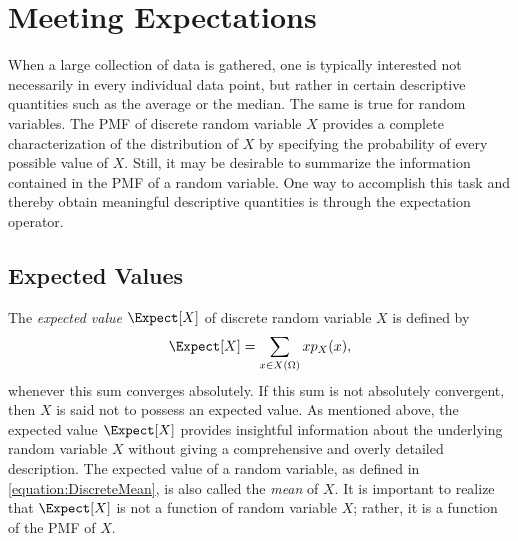 \chapter{Meeting Expectations}
\label{chapter:ExpectationsDiscrete}

When a large collection of data is gathered, one is typically interested not necessarily in every individual data point, but rather in certain descriptive quantities such as the average or the median.
The same is true for random variables.
The PMF of discrete random variable $X$ provides a complete characterization of the distribution of $X$ by specifying the probability of every possible value of $X$.
Still, it may be desirable to summarize the information contained in the PMF of a random variable.
One way to accomplish this task and thereby obtain meaningful descriptive quantities is through the expectation operator.


\section{Expected Values}

The \emph{expected value} $\Expect [X]$ of discrete random variable $X$ is defined by 
\begin{equation} \label{equation:DiscreteMean}
\Expect [X] = \sum_{x \in X(\Omega)} x p_X (x) ,
\end{equation}
whenever this sum converges absolutely.
If this sum is not absolutely convergent, then $X$ is said not to possess an expected value.
As mentioned above, the expected value $\Expect [X]$ provides insightful information about the underlying random variable $X$ without giving a comprehensive and overly detailed description.
The expected value of a random variable, as defined in \eqref{equation:DiscreteMean}, is also called the \emph{mean} of $X$. 
It is important to realize that $\Expect [X]$ is not a function of random variable $X$; rather, it is a function of the PMF of $X$.

